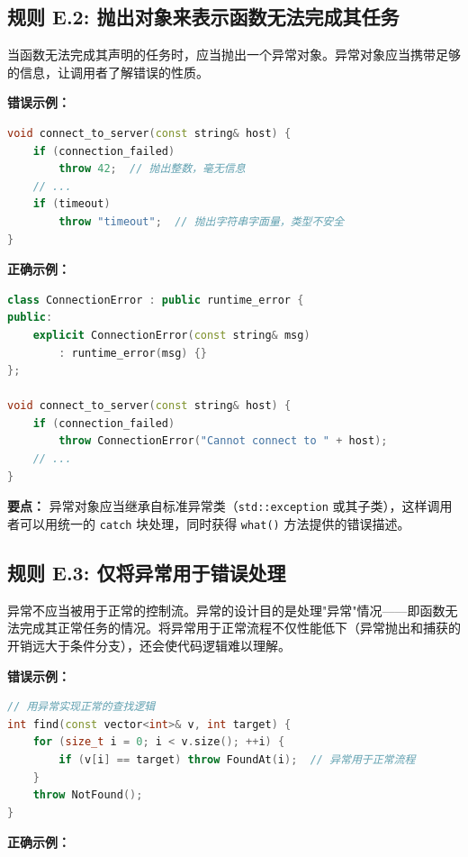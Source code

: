 \subsection*{\textbf{规则 E.2:} 抛出对象来表示函数无法完成其任务}

当函数无法完成其声明的任务时，应当抛出一个异常对象。异常对象应当携带足够的信息，让调用者了解错误的性质。

\textbf{错误示例：}

\begin{lstlisting}[language=C++]
void connect_to_server(const string& host) {
    if (connection_failed)
        throw 42;  // 抛出整数，毫无信息
    // ...
    if (timeout)
        throw "timeout";  // 抛出字符串字面量，类型不安全
}
\end{lstlisting}

\textbf{正确示例：}

\begin{lstlisting}[language=C++]
class ConnectionError : public runtime_error {
public:
    explicit ConnectionError(const string& msg)
        : runtime_error(msg) {}
};

void connect_to_server(const string& host) {
    if (connection_failed)
        throw ConnectionError("Cannot connect to " + host);
    // ...
}
\end{lstlisting}

\textbf{要点：} 异常对象应当继承自标准异常类（\texttt{std::exception} 或其子类），这样调用者可以用统一的 \texttt{catch} 块处理，同时获得 \texttt{what()} 方法提供的错误描述。

\subsection*{\textbf{规则 E.3:} 仅将异常用于错误处理}

异常不应当被用于正常的控制流。异常的设计目的是处理"异常"情况——即函数无法完成其正常任务的情况。将异常用于正常流程不仅性能低下（异常抛出和捕获的开销远大于条件分支），还会使代码逻辑难以理解。

\textbf{错误示例：}

\begin{lstlisting}[language=C++]
// 用异常实现正常的查找逻辑
int find(const vector<int>& v, int target) {
    for (size_t i = 0; i < v.size(); ++i) {
        if (v[i] == target) throw FoundAt(i);  // 异常用于正常流程
    }
    throw NotFound();
}
\end{lstlisting}

\textbf{正确示例：}

